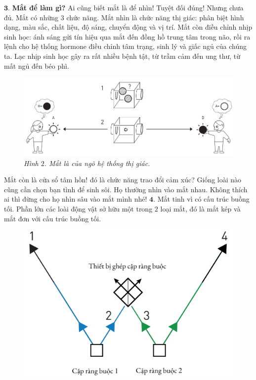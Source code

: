 \begin{multicols}{2}
	\vskip 0.1cm
	$\pmb{3.}$	\textbf{\color{timhieukhoahoc}Mắt để làm gì?}
	\vskip 0.1cm
	Ai cũng biết mắt là để nhìn! Tuyệt đối đúng! Nhưng chưa đủ. Mắt có những $3$ chức năng.  
	\vskip 0.1cm
	Mắt nhìn là chức năng thị giác: phân biệt hình dạng, màu sắc, chất liệu, độ sáng, chuyển động và vị trí. Mắt còn điều chỉnh nhịp sinh học: ánh sáng gửi tín hiệu qua mắt đến đồng hồ trung tâm trong não, rồi ra lệnh cho hệ thống hormone điều chỉnh tâm trạng, sinh lý và giấc ngủ của chúng ta. Lạc nhịp sinh học gây ra rất nhiều bệnh tật, từ trầm cảm đến ung thư, từ mất ngủ đến béo phì. 
	\begin{figure}[H]
		\vspace*{-5pt}
		\centering
		\captionsetup{labelformat= empty, justification=centering}
		\includegraphics[width= 1\linewidth]{2}
		\caption{\small\textit{\color{timhieukhoahoc}Hình $2$. Mắt là của ngõ hệ thống thị giác.}}
		\vspace*{-10pt}
	\end{figure}
	Mắt còn là cửa sổ tâm hồn! đó là chức năng trao đổi cảm xúc? Giống loài nào cũng cần chọn bạn tình để sinh sôi. Họ thường nhìn vào mắt nhau. Không thích ai thì đừng cho họ nhìn sâu vào mắt mình nhé!
	\vskip 0.1cm
	$\pmb{4.}$ Mắt tinh vì có cấu trúc buồng tối. Phần lớn các loài động vật sở hữu một trong $2$ loại mắt, đó là mắt kép và mắt đơn với cấu trúc buồng tối. 
	\begin{figure}[H]
		\vspace*{-5pt}
		\centering
		\captionsetup{labelformat= empty, justification=centering}
		\includegraphics[width= 0.9\linewidth]{3}

\end{figure}
\end{multicols}
